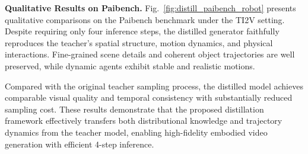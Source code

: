 \textbf{Qualitative Results on Paibench.}
Fig.~\ref{fig:distill_paibench_robot} presents qualitative comparisons on the Paibench benchmark under the TI2V setting. Despite requiring only four inference steps, the distilled generator faithfully reproduces the teacher's spatial structure, motion dynamics, and physical interactions. Fine-grained scene details and coherent object trajectories are well preserved, while dynamic agents exhibit stable and realistic motions.

Compared with the original teacher sampling process, the distilled model achieves comparable visual quality and temporal consistency with substantially reduced sampling cost. These results demonstrate that the proposed distillation framework effectively transfers both distributional knowledge and trajectory dynamics from the teacher model, enabling high-fidelity embodied video generation with efficient 4-step inference.